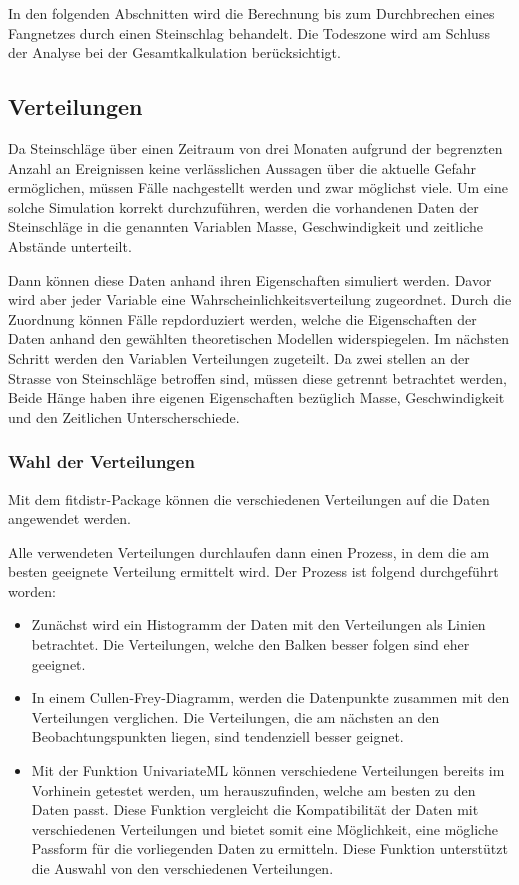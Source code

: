 \documentclass[
  letterpaper,
  DIV=11,
  numbers=noendperiod]{scrartcl}
\begin{document}
In den folgenden Abschnitten wird die Berechnung bis zum Durchbrechen
eines Fangnetzes durch einen Steinschlag behandelt. Die Todeszone wird
am Schluss der Analyse bei der Gesamtkalkulation berücksichtigt.

\subsection{Verteilungen}\label{verteilungen}

Da Steinschläge über einen Zeitraum von drei Monaten aufgrund der
begrenzten Anzahl an Ereignissen keine verlässlichen Aussagen über die
aktuelle Gefahr ermöglichen, müssen Fälle nachgestellt werden und zwar
möglichst viele. Um eine solche Simulation korrekt durchzuführen, werden
die vorhandenen Daten der Steinschläge in die genannten Variablen Masse,
Geschwindigkeit und zeitliche Abstände unterteilt.

Dann können diese Daten anhand ihren Eigenschaften simuliert werden.
Davor wird aber jeder Variable eine Wahrscheinlichkeitsverteilung
zugeordnet. Durch die Zuordnung können Fälle repdorduziert werden,
welche die Eigenschaften der Daten anhand den gewählten theoretischen
Modellen widerspiegelen. Im nächsten Schritt werden den Variablen
Verteilungen zugeteilt. Da zwei stellen an der Strasse von Steinschläge
betroffen sind, müssen diese getrennt betrachtet werden, Beide Hänge
haben ihre eigenen Eigenschaften bezüglich Masse, Geschwindigkeit und
den Zeitlichen Unterscherschiede.

\subsubsection{Wahl der Verteilungen}\label{wahl-der-verteilungen}

Mit dem fitdistr-Package können die verschiedenen Verteilungen auf die
Daten angewendet werden.

Alle verwendeten Verteilungen durchlaufen dann einen Prozess, in dem die
am besten geeignete Verteilung ermittelt wird. Der Prozess ist folgend
durchgeführt worden:

\begin{itemize}
\item
  Zunächst wird ein Histogramm der Daten mit den Verteilungen als Linien
  betrachtet. Die Verteilungen, welche den Balken besser folgen sind
  eher geeignet.
\item
  In einem Cullen-Frey-Diagramm, werden die Datenpunkte zusammen mit den
  Verteilungen verglichen. Die Verteilungen, die am nächsten an den
  Beobachtungspunkten liegen, sind tendenziell besser geignet.
\item
  Mit der Funktion UnivariateML können verschiedene Verteilungen bereits
  im Vorhinein getestet werden, um herauszufinden, welche am besten zu
  den Daten passt. Diese Funktion vergleicht die Kompatibilität der
  Daten mit verschiedenen Verteilungen und bietet somit eine
  Möglichkeit, eine mögliche Passform für die vorliegenden Daten zu
  ermitteln. Diese Funktion unterstützt die Auswahl von den
  verschiedenen Verteilungen.
\end{itemize}
\end{document}
